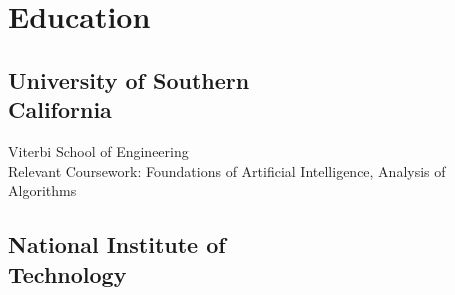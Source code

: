 \documentclass[]{deedy-resume-openfont}
\begin{document}
\begin{minipage}[t]{0.33\textwidth} 


\section{Education} 

\subsection[University of Southern California]{University of Southern\\ California}
Viterbi School of Engineering \\
Relevant Coursework: Foundations of Artificial Intelligence, Analysis of Algorithms
\sectionsep

\subsection[National Institute of Technology]{National Institute of \\ Technology}
\sectionsep


%
%
%


\end{minipage}
\end{document}
